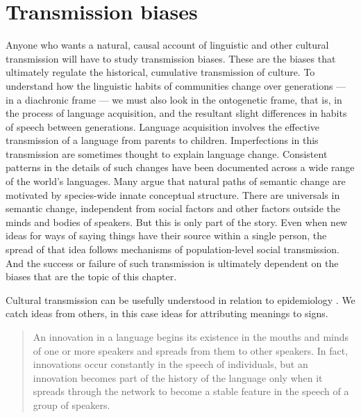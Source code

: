 
\chapter{Transmission biases}
\label{Transmission biases}



Anyone who wants a natural, causal account of linguistic and other cultural transmission will have to study transmission biases. These are the biases that ultimately regulate the historical, cumulative transmission of culture. To understand how the linguistic habits of communities change over generations --- in a diachronic frame --- we must also look in the ontogenetic frame, that is, in the process of language acquisition, and the resultant slight differences in habits of speech between generations. Language acquisition involves the effective transmission of a language from parents to children. Imperfections in this transmission are sometimes thought to explain language change. Consistent patterns in the details of such changes have been documented across a wide range of the world's languages. Many argue that natural paths of semantic change are motivated by species-wide innate conceptual structure. There are universals in semantic change, independent from social factors and other factors outside the minds and bodies of speakers. But this is only part of the story. Even when new ideas for ways of saying things have their source within a single person, the spread of that idea follows mechanisms of population-level social transmission. And the success or failure of such transmission is ultimately dependent on the biases that are the topic of this chapter.

Cultural transmission can be usefully understood in relation to epidemiology \citep{dawkins_selfish_1976,sperber_anthropology_1985}. We catch ideas from others, in this case ideas for attributing meanings to signs.


\begin{quotation}
	An innovation in a language begins its existence in the mouths and minds of one or more speakers and spreads from them to other speakers. In fact, innovations occur constantly in the speech of individuals, but an innovation becomes part of the history of the language only when it spreads through the network to become a stable feature in the speech of a group of speakers. \citep[214-5]{ross_social_1997} 

\end{quotation}
	
